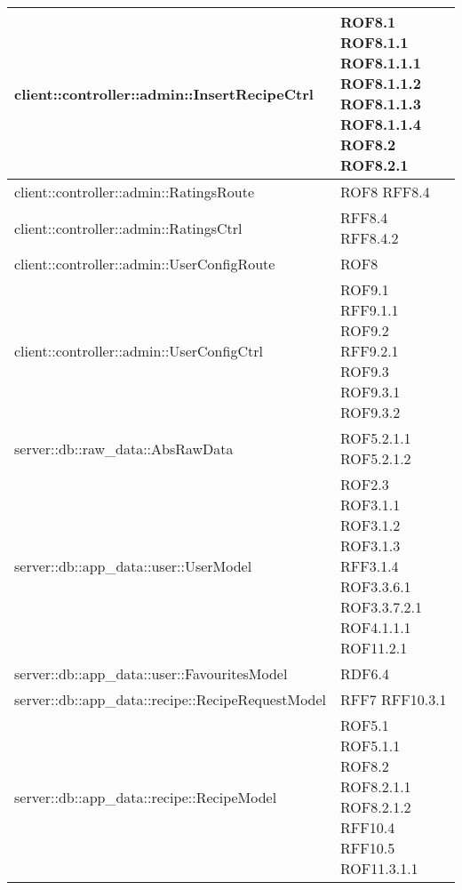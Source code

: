 \begin{center}
\begin{longtable}{| p{11cm} | p{2.5cm} |}
\hline
client::controller::admin::InsertRecipeCtrl & ROF8.1 \newline ROF8.1.1 \newline ROF8.1.1.1 \newline ROF8.1.1.2 \newline ROF8.1.1.3 \newline ROF8.1.1.4 \newline ROF8.2 \newline ROF8.2.1 \\
\hline
client::controller::admin::RatingsRoute & ROF8 \newline RFF8.4 \\
\hline
client::controller::admin::RatingsCtrl & RFF8.4 \newline RFF8.4.2 \\
\hline
client::controller::admin::UserConfigRoute & ROF8 \\
\hline
client::controller::admin::UserConfigCtrl & ROF9.1 \newline RFF9.1.1 \newline ROF9.2 \newline RFF9.2.1 \newline ROF9.3 \newline ROF9.3.1 \newline ROF9.3.2 \\
\hline
server::db::raw\_data::AbsRawData & ROF5.2.1.1 \newline ROF5.2.1.2 \\
\hline
server::db::app\_data::user::UserModel & ROF2.3 \newline ROF3.1.1 \newline ROF3.1.2 \newline ROF3.1.3 \newline RFF3.1.4 \newline ROF3.3.6.1 \newline ROF3.3.7.2.1 \newline ROF4.1.1.1 \newline ROF11.2.1 \\
\hline
server::db::app\_data::user::FavouritesModel & RDF6.4 \\
\hline
server::db::app\_data::recipe::RecipeRequestModel & RFF7 \newline RFF10.3.1 \\
\hline
server::db::app\_data::recipe::RecipeModel & ROF5.1 \newline ROF5.1.1 \newline ROF8.2 \newline ROF8.2.1.1 \newline ROF8.2.1.2 \newline RFF10.4 \newline RFF10.5 \newline ROF11.3.1.1 \\

\end{longtable}
\end{center}
